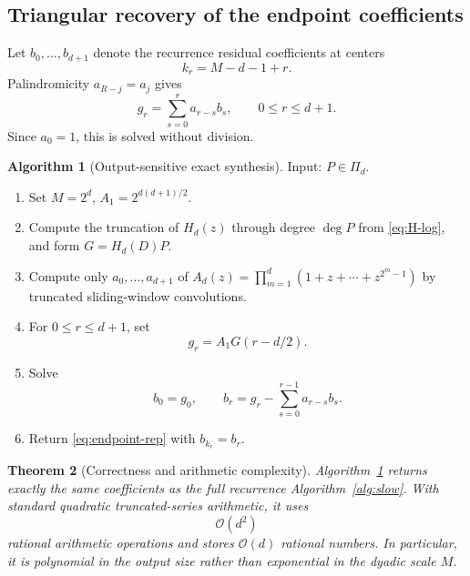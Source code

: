 \documentclass[11pt,oneside]{article}
\newtheorem{theorem}{Theorem}[section]
\theoremstyle{definition}
\newtheorem{algorithm}[theorem]{Algorithm}
\theoremstyle{remark}
\newcommand{\bigO}{\mathcal O}
\begin{document}
\subsection{Triangular recovery of the endpoint coefficients}
Let $b_0,\ldots,b_{d+1}$ denote the recurrence residual coefficients at centers
\begin{equation}
 k_r=M-d-1+r.                                              \label{eq:k-r}
\end{equation}
Palindromicity $a_{R-j}=a_j$ gives
\begin{equation}
 g_r=\sum_{s=0}^{r}a_{r-s}b_s,
 \qquad0\le r\le d+1.                                    \label{eq:triangular-conv}
\end{equation}
Since $a_0=1$, this is solved without division.

\begin{algorithm}[Output-sensitive exact synthesis]
\label{alg:fast}
Input: $P\in\Pi_d$.
\begin{enumerate}
\item Set $M=2^d$, $A_1=2^{d(d+1)/2}$.
\item Compute the truncation of $H_d(z)$ through degree $\deg P$ from \eqref{eq:H-log}, and form $G=H_d(D)P$.
\item Compute only $a_0,\ldots,a_{d+1}$ of
\(
 A_d(z)=\prod_{m=1}^{d}(1+z+\cdots+z^{2^m-1})
\)
by truncated sliding-window convolutions.
\item For $0\le r\le d+1$, set
\begin{equation}
 g_r=A_1G(r-d/2).                                         \label{eq:alg-g}
\end{equation}
\item Solve
\begin{equation}
 b_0=g_0,
 \qquad
 b_r=g_r-\sum_{s=0}^{r-1}a_{r-s}b_s.                     \label{eq:alg-b}
\end{equation}
\item Return \eqref{eq:endpoint-rep} with $b_{k_r}=b_r$.
\end{enumerate}
\end{algorithm}

\begin{theorem}[Correctness and arithmetic complexity]
\label{thm:fast-correct}
Algorithm~\ref{alg:fast} returns exactly the same coefficients as the full recurrence Algorithm~\ref{alg:slow}.  With standard quadratic truncated-series arithmetic, it uses
\begin{equation}
 \bigO(d^2)                                                \label{eq:complexity-one-cell}
\end{equation}
rational arithmetic operations and stores $\bigO(d)$ rational numbers.  In particular, it is polynomial in the output size rather than exponential in the dyadic scale $M$.
\end{theorem}
\end{document}

